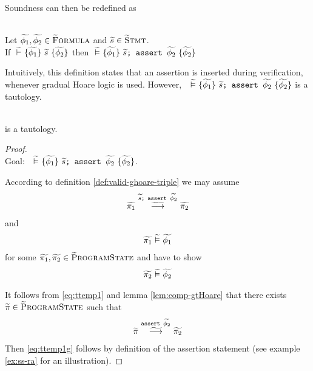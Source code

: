 Soundness can then be redefined as
\begin{definition}\label{def:gsnd}~\\
    Let $\widetilde{\phi_1}, \widetilde{\phi_2} \in \textup{\textsc{\ensuremath{\widetilde{\text{F}}}ormula}}$ and $\widetilde{s} \in \textup{\textsc{\ensuremath{\widetilde{\text{S}}}tmt}}$.\\
    If ${} \,\,\widetilde{\vdash}\,\, \{{\widetilde{\phi_1}}\} ~{\widetilde{s}}~ \{{\widetilde{\phi_2}}\}$ then ${} \,\,\widetilde{\vDash}\,\, \{{\widetilde{\phi_1}}\} ~{\textup{\texttt{{$\widetilde{s}$};~{\textup{\texttt{assert $\widetilde{\phi_2}$}}}}}}~ \{{\widetilde{\phi_2}}\}$
\end{definition}
Intuitively, this definition states that an assertion is inserted during verification, whenever gradual Hoare logic is used.
However, ${~} \,\,\widetilde{\vDash}\,\, \{{\widetilde{\phi_1}}\} ~{\textup{\texttt{{$\widetilde{s}$};~{\textup{\texttt{assert $\widetilde{\phi_2}$}}}}}}~ \{{\widetilde{\phi_2}}\}$ is a tautology.

\begin{lemma}
    \label{lemma:tauto}~\\
     is a tautology. 
\end{lemma}
\begin{proof}~\\
    Goal: ${~} \,\,\widetilde{\vDash}\,\, \{{\widetilde{\phi_1}}\} ~{\textup{\texttt{{$\widetilde{s}$};~{\textup{\texttt{assert $\widetilde{\phi_2}$}}}}}}~ \{{\widetilde{\phi_2}}\}$.
    
    According to definition \ref{def:valid-ghoare-triple} we may assume
    \begin{align}
    \label{eq:ttemp1}
    \gsstepConsume{\sSeq{$\grad{s}$}{\sAssert{$\grad{\phi_2}$}}}{\grad{\pi_1}}{\grad{\pi_2}}
    \end{align}
    and
    \begin{align}
    \widetilde{\pi_1} \,\,\widetilde{\vDash}\,\, \widetilde{\phi_1}
    \end{align}
    for some $\widetilde{\pi_1}, \widetilde{\pi_2} \in \textup{\textsc{\ensuremath{\widetilde{\text{P}}}rogramState}}$ and have to show
    \begin{align}
    \label{eq:ttemp1g}
    \evalgphiGen{\grad{\pi_2}}{\grad{\phi_2}}
    \end{align}
    
    It follows from \ref{eq:ttemp1} and lemma \ref{lem:comp-gtHoare} that there exists $\widetilde{\pi} \in \textup{\textsc{\ensuremath{\widetilde{\text{P}}}rogramState}}$ such that
    \begin{align}
    \label{eq:ttemp2}
    \gsstepConsume{\sAssert{$\grad{\phi_2}$}}{\grad{\pi}}{\grad{\pi_2}}
    \end{align}
    Then \ref{eq:ttemp1g} follows by definition of the assertion statement (see example \ref{ex:ss-ra} for an illustration).
\end{proof}

